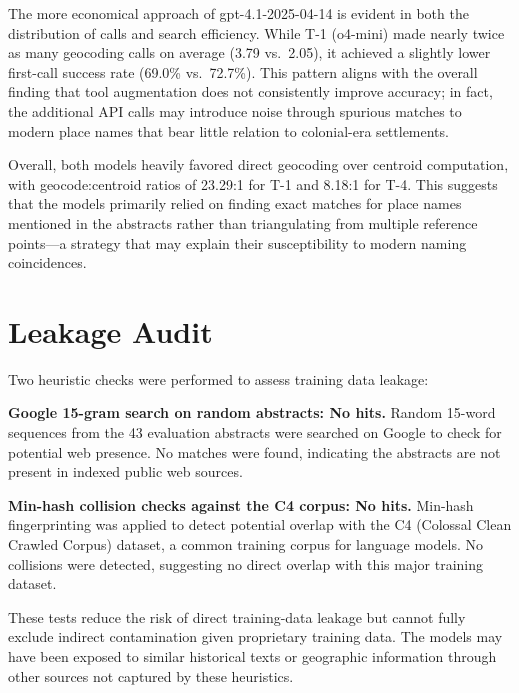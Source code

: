 The more economical approach of gpt-4.1-2025-04-14 is evident in both
the distribution of calls and search efficiency. While T-1 (o4-mini)
made nearly twice as many geocoding calls on average (3.79 vs.~2.05), it
achieved a slightly lower first-call success rate (69.0\% vs.~72.7\%).
This pattern aligns with the overall finding that tool augmentation does
not consistently improve accuracy; in fact, the additional API calls may
introduce noise through spurious matches to modern place names that bear
little relation to colonial-era settlements.

Overall, both models heavily favored direct geocoding over centroid
computation, with geocode:centroid ratios of 23.29:1 for T-1 and 8.18:1
for T-4. This suggests that the models primarily relied on finding exact
matches for place names mentioned in the abstracts rather than
triangulating from multiple reference points---a strategy that may
explain their susceptibility to modern naming coincidences.

\section{Leakage Audit}\label{appendix-e-leakage-audit}

Two heuristic checks were performed to assess training data leakage:

\textbf{Google 15-gram search on random abstracts: No hits.} Random
15-word sequences from the 43 evaluation abstracts were searched on
Google to check for potential web presence. No matches were found,
indicating the abstracts are not present in indexed public web sources.

\textbf{Min-hash collision checks against the C4 corpus: No hits.}
Min-hash fingerprinting was applied to detect potential overlap with the
C4 (Colossal Clean Crawled Corpus) dataset, a common training corpus for
language models. No collisions were detected, suggesting no direct
overlap with this major training dataset.

These tests reduce the risk of direct training-data leakage but cannot
fully exclude indirect contamination given proprietary training data.
The models may have been exposed to similar historical texts or
geographic information through other sources not captured by these
heuristics.
